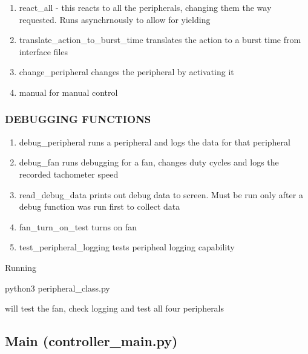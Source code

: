 \documentclass[
]{article}
\newenvironment{Shaded}{}{}
\newcommand{\ExtensionTok}[1]{#1}
\newcommand{\NormalTok}[1]{#1}
\providecommand{\tightlist}{%
  \setlength{\itemsep}{0pt}\setlength{\parskip}{0pt}}
\begin{document}
\begin{enumerate}
\def\labelenumi{\arabic{enumi}.}
\tightlist
\item
  react\_all - this reacts to all the peripherals, changing them the way
  requested. Runs asynchrnously to allow for yielding
\item
  translate\_action\_to\_burst\_time translates the action to a burst
  time from interface files
\item
  change\_peripheral changes the peripheral by activating it
\item
  manual for manual control
\end{enumerate}

\hypertarget{debugging-functions-1}{%
\subsubsection{DEBUGGING FUNCTIONS}\label{debugging-functions-1}}

\begin{enumerate}
\def\labelenumi{\arabic{enumi}.}
\tightlist
\item
  debug\_peripheral runs a peripheral and logs the data for that
  peripheral
\item
  debug\_fan runs debugging for a fan, changes duty cycles and logs the
  recorded tachometer speed
\item
  read\_debug\_data prints out debug data to screen. Must be run only
  after a debug function was run first to collect data
\item
  fan\_turn\_on\_test turns on fan
\item
  test\_peripheral\_logging tests peripheal logging capability
\end{enumerate}

Running

\begin{Shaded}
\begin{Highlighting}[]
\ExtensionTok{python3}\NormalTok{ peripheral\_class.py}
\end{Highlighting}
\end{Shaded}

will test the fan, check logging and test all four peripherals

\hypertarget{main-controller_main.py}{%
\subsection{Main (controller\_main.py)}\label{main-controller_main.py}}
\end{document}
